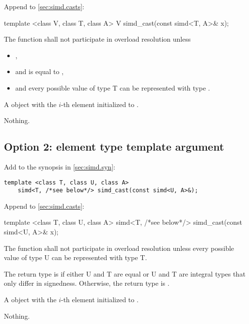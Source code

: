 Append to \ref{sec:simd.casts}:
\begin{wgText}
  \begin{itemdecl}
    template <class V, class T, class A> V simd_cast(const simd<T, A>& x);
  \end{itemdecl}
  \begin{itemdescr}
    \pnum\remarks The function shall not participate in overload resolution unless
    \begin{itemize}
      \item {},
      \item and  is equal to ,
      \item and every possible value of type \type T can be represented with type \simd\code{::}.
    \end{itemize}
    \pnum\returns A \simd object with the $i$-th element initialized to .

    \pnum\throws Nothing.
  \end{itemdescr}
\end{wgText}

\subsection{Option 2: element type template argument}
Add to the synopsis in \ref{sec:simd.syn}:
\begin{wgText}
  \begin{lstlisting}[style=Vc]
    template <class T, class U, class A>
    simd<T, /*see below*/> simd_cast(const simd<U, A>&);
  \end{lstlisting}
\end{wgText}

Append to \ref{sec:simd.casts}:
\begin{wgText}
  \begin{itemdecl}
    template <class T, class U, class A>
    simd<T, /*see below*/> simd_cast(const simd<U, A>& x);
  \end{itemdecl}
  \begin{itemdescr}
    \pnum\remarks The function shall not participate in overload resolution unless every possible value of type \type U can be represented with type \type T.

    \pnum\remarks The return type is \simd[<T, A>] if either \type U and \type T are equal or \type U and \type T are integral types that only differ in signedness.
    Otherwise, the return type is .

    \pnum\returns A \simd object with the $i$-th element initialized to .

    \pnum\throws Nothing.
  \end{itemdescr}
\end{wgText}

